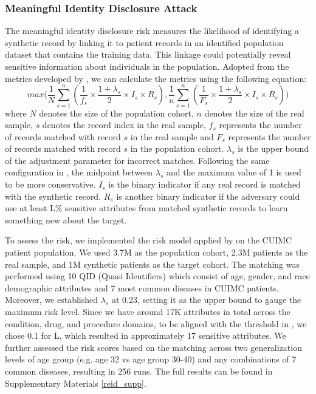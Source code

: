 \begin{multicols}{2}
\subsubsection{Meaningful Identity Disclosure Attack}
The meaningful identity disclosure risk measures the likelihood of identifying a synthetic record by linking it to patient records in an identified population dataset that contains the training data. This linkage could potentially reveal sensitive information about individuals in the population. Adopted from the metrics developed by \cite{el2020evaluating}, we can calculate the metrics using the following equation:
\small
\[
    max\Big(\frac{1}{N}\sum^n_{s=1}(\frac{1}{f_s}\times\frac{1+\lambda_s}{2}\times I_s \times R_s), \frac{1}{n}\sum^n_{s=1}(\frac{1}{F_s}\times\frac{1+\lambda_s}{2}\times I_s \times R_s)\Big)
\]
\normalsize
where $N$ denotes the size of the population cohort, $n$ denotes the size of the real sample, $s$ denotes the record index in the real sample, $f_s$ represents the number of records matched with record $s$ in the real sample and $F_s$ represents the number of records matched with record $s$ in the population cohort. $\lambda_s$ is the upper bound of the adjustment parameter for incorrect matches. Following the same configuration in \cite{el2020evaluating}, the midpoint between $\lambda_s$ and the maximum value of 1 is used to be more conservative. $I_s$ is the binary indicator if any real record is matched with the synthetic record. $R_s$ is another binary indicator if the adversary could use at least L\% sensitive attributes from matched synthetic records to learn something new about the target.

To assess the risk, we implemented the risk model applied by \cite{Yan_Brad_2022} on the CUIMC patient population. We used 3.7M as the population cohort, 2.3M patients as the real sample, and 1M synthetic patients as the target cohort. The matching was performed using 10 QID (Quasi Identifiers) which consist of age, gender, and race demographic attributes and 7 most common diseases in CUIMC patients. Moreover, we established $\lambda_s$ at 0.23, setting it as the upper bound to gauge the maximum risk level. Since we have around 17K attributes in total across the condition, drug, and procedure domains, to be aligned with the threshold in \cite{Yan_Brad_2022}, we chose 0.1 for L, which resulted in approximately 17 sensitive attributes. We further assessed the risk scores based on the matching across two generalization levels of age group (e.g. age 32 vs age group 30-40) and any combinations of 7 common diseases, resulting in 256 runs. The full results can be found in Supplementary Materials \ref{reid_supp}.


\end{multicols}
